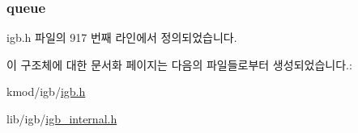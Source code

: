 \subsubsection[{\texorpdfstring{queue}{queue}}]{ queue}\hypertarget{structigb__buf__cmd_a6be361df991687a3b78645e3e8fa853d}{}\label{structigb__buf__cmd_a6be361df991687a3b78645e3e8fa853d}


igb.\+h 파일의 917 번째 라인에서 정의되었습니다.



이 구조체에 대한 문서화 페이지는 다음의 파일들로부터 생성되었습니다.\+:\begin{DoxyCompactItemize}
\item 
kmod/igb/\hyperlink{kmod_2igb_2igb_8h}{igb.\+h}\item 
lib/igb/\hyperlink{igb__internal_8h}{igb\+\_\+internal.\+h}\end{DoxyCompactItemize}
